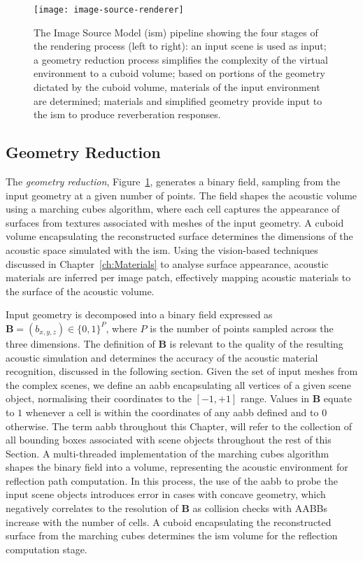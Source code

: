 \begin{figure}[htb]
    \centering
    \texttt{[image: image-source-renderer]}
    \caption[Image-Source Model-based acoustic rendering pipeline]{The Image Source Model (\acrshort{ism}) pipeline showing the four stages of the rendering process (left to right): an input scene is used as input; a geometry reduction process simplifies the complexity of the virtual environment to a cuboid volume; based on portions of the geometry dictated by the cuboid volume, materials of the input environment are determined; materials and simplified geometry provide input to the \acrshort{ism} to produce reverberation responses.}
\label{fig:image-source-pipeline}
\end{figure}

\subsection{Geometry Reduction}
The \emph{geometry reduction}, Figure~\ref{fig:image-source-pipeline}, generates a binary field, sampling from the input geometry at a given number of points. The field shapes the acoustic volume using a marching cubes algorithm, where each cell captures the appearance of surfaces from textures associated with meshes of the input geometry. A cuboid volume encapsulating the reconstructed surface determines the dimensions of the acoustic space simulated with the \acrshort{ism}. Using the vision-based techniques discussed in Chapter~\ref{ch:Materials} to analyse surface appearance, acoustic materials are inferred per image patch, effectively mapping acoustic materials to the surface of the acoustic volume.\par
Input geometry is decomposed into a binary field expressed as $\mathbf{B} = (b_{x,y,z}) \in \{ 0, 1 \}^{P}$, where $P$ is the number of points sampled across the three dimensions. The definition of $\mathbf{B}$ is relevant to the quality of the resulting acoustic simulation and determines the accuracy of the acoustic material recognition, discussed in the following section. Given the set of input meshes from the complex scenes, we define an \acrfull{aabb} encapsulating all vertices of a given scene object, normalising their coordinates to the $[-1, +1]$ range. Values in $\mathbf{B}$ equate to $1$ whenever a cell is within the coordinates of any \acrshort{aabb} defined and to $0$ otherwise. The term \acrshort{aabb} throughout this Chapter, will refer to the collection of all bounding boxes associated with scene objects throughout the rest of this Section. A multi-threaded implementation of the marching cubes algorithm \citep{bourke1994polygonising, lengyel2019foundations} shapes the binary field into a volume, representing the acoustic environment for reflection path computation. In this process, the use of the \acrshort{aabb} to probe the input scene objects introduces error in cases with concave geometry, which negatively correlates to the resolution of $\mathbf{B}$ as collision checks with AABBs increase with the number of cells. A cuboid encapsulating the reconstructed surface from the marching cubes determines the \acrshort{ism} volume for the reflection computation stage.\par

